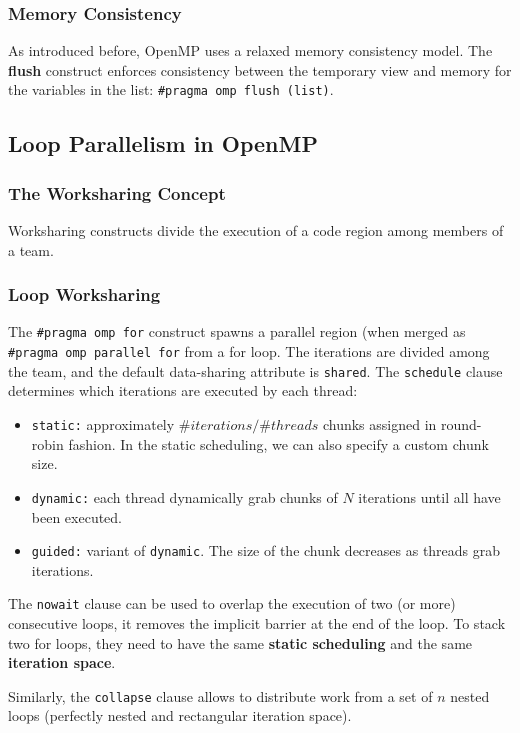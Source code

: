 \subsubsection{Memory Consistency}

As introduced before, OpenMP uses a relaxed memory consistency model.
The \textbf{flush} construct enforces consistency between the temporary view and memory for the variables in the list: \texttt{\#pragma omp flush (list)}.

\subsection{Loop Parallelism in OpenMP}

\subsubsection{The Worksharing Concept}
Worksharing constructs divide the execution of a code region among members of a team.

\subsubsection{Loop Worksharing}
The \texttt{\#pragma omp for} construct spawns a parallel region (when merged as \texttt{\#pragma omp parallel for} from a for loop.
The iterations are divided among the team, and the default data-sharing attribute is \texttt{shared}.
The \texttt{schedule} clause determines which iterations are executed by each thread:
\begin{itemize}
    \item \texttt{static:} approximately $\#iterations / \#threads$ chunks assigned in round-robin fashion. In the static scheduling, we can also specify a custom chunk size.
    \item \texttt{dynamic:} each thread dynamically grab chunks of $N$ iterations until all have been executed.
    \item \texttt{guided:} variant of \texttt{dynamic}. The size of the chunk decreases as threads grab iterations.
\end{itemize}

The \texttt{nowait} clause can be used to overlap the execution of two (or more) consecutive loops, it removes the implicit barrier at the end of the loop.
To stack two for loops, they need to have the same \textbf{static scheduling} and the same \textbf{iteration space}.

Similarly, the \texttt{collapse} clause allows to distribute work from a set of $n$ nested loops (perfectly nested and rectangular iteration space).

